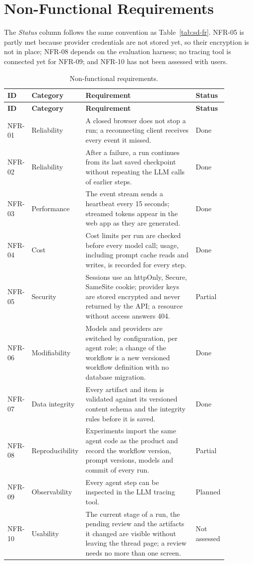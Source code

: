 \section{Non-Functional Requirements}
\label{sec:sd-nfr}

The \emph{Status} column follows the same convention as Table~\ref{tab:sd-fr}. NFR-05 is partly met because provider credentials are not stored yet, so their encryption is not in place; NFR-08 depends on the evaluation harness; no tracing tool is connected yet for NFR-09; and NFR-10 has not been assessed with users.

\begingroup{}
\begin{longtable}{|p{0.1\linewidth}|p{0.17\linewidth}|p{0.5\linewidth}|p{0.11\linewidth}|}
    \caption{Non-functional requirements.}
    \label{tab:sd-nfr} \\
    \hline
    \textbf{ID} & \textbf{Category} & \textbf{Requirement} & \textbf{Status} \\
    \hline
    \endfirsthead
    \hline
    \textbf{ID} & \textbf{Category} & \textbf{Requirement} & \textbf{Status} \\
    \hline
    \endhead
    NFR-01 & Reliability & A closed browser does not stop a run; a reconnecting client receives every event it missed. & Done \\ \hline
    NFR-02 & Reliability & After a failure, a run continues from its last saved checkpoint without repeating the LLM calls of earlier steps. & Done \\ \hline
    NFR-03 & Performance & The event stream sends a heartbeat every 15 seconds; streamed tokens appear in the web app as they are generated. & Done \\ \hline
    NFR-04 & Cost & Cost limits per run are checked before every model call; usage, including prompt cache reads and writes, is recorded for every step. & Done \\ \hline
    NFR-05 & Security & Sessions use an httpOnly, Secure, SameSite cookie; provider keys are stored encrypted and never returned by the API; a resource without access answers 404. & Partial \\ \hline
    NFR-06 & Modifiability & Models and providers are switched by configuration, per agent role; a change of the workflow is a new versioned workflow definition with no database migration. & Done \\ \hline
    NFR-07 & Data integrity & Every artifact and item is validated against its versioned content schema and the integrity rules before it is saved. & Done \\ \hline
    NFR-08 & Reproducibility & Experiments import the same agent code as the product and record the workflow version, prompt versions, models and commit of every run. & Partial \\ \hline
    NFR-09 & Observability & Every agent step can be inspected in the LLM tracing tool. & Planned \\ \hline
    NFR-10 & Usability & The current stage of a run, the pending review and the artifacts it changed are visible without leaving the thread page; a review needs no more than one screen. & Not assessed \\ \hline
\end{longtable}
\endgroup
